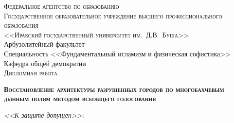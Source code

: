 
\thispagestyle{empty}

\begin{center}

        \textsc{Федеральное агентство по образованию}\\[0.2cm]

        \textsc{Государственное образовательное учреждение высшего
профессионального образования \\ <<Иракский государственный университет
им.~Д.В.~Буша>>}\\[0.7cm]

        Арбузолитейный факультет\\[0.5cm]

        Специальность <<Фундаментальный исламизм и физическая
софистика>>\\[0.7cm]

        Кафедра общей демократии\\[0.7cm]

        \textsc{Дипломная работа}\\[0.7cm]

        \begin{large}
                \textsc{\textbf{Восстановление архитектуры разрушенных
городов по многобахчевым дынным полям методом всеобщего голосования}}
        \end{large}

\end{center}

\vspace{0.7cm}

\textit{<<К защите допущен>>:}

